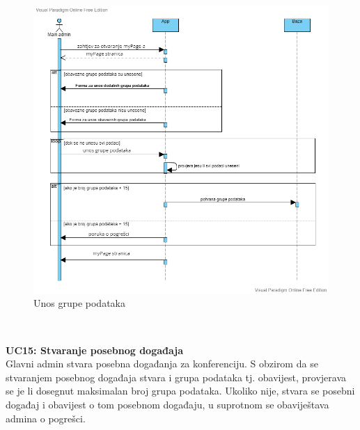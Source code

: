 		        \begin{figure}[H]
			            \includegraphics[scale=0.55]{slike/stvaranje grupe podataka (1).png} %
			            \centering
			            \caption{Unos grupe podataka}
			            \label{fig:seq-dijagram2}
		        \end{figure}\\
				
				\eject

             \textbf{UC15: Stvaranje posebnog događaja}\\
				
				{Glavni admin stvara posebna događanja za konferenciju. S obzirom da se stvaranjem posebnog događaja stvara i grupa podataka tj. obavijest, provjerava se je li dosegnut maksimalan broj grupa podataka. Ukoliko nije, stvara se posebni događaj i obavijest o tom posebnom događaju, u suprotnom se obaviještava admina o pogrešci.}
				
